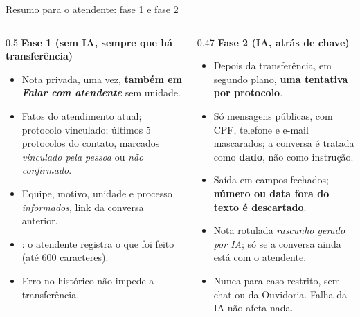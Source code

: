 \documentclass[aspectratio=169,10pt]{beamer}
\newcommand{\code}[1]{\texttt{\detokenize{#1}}}
\begin{document}
\begin{frame}{Resumo para o atendente: fase 1 e fase 2}
\begin{columns}[T]
\begin{column}{0.5\textwidth}
\textbf{Fase 1 (sem IA, sempre que há transferência)}
\begin{itemize}\setlength\itemsep{3pt}\scriptsize
  \item Nota privada, uma vez, \textbf{também em \emph{Falar com atendente}} sem unidade.
  \item Fatos do atendimento atual; protocolo vinculado; últimos 5 protocolos do contato, marcados \emph{vinculado pela pessoa} ou \emph{não confirmado}.
  \item Equipe, motivo, unidade e processo \emph{informados}, link da conversa anterior.
  \item \code{/encerrar <resumo>}: o atendente registra o que foi feito (até 600 caracteres).
  \item Erro no histórico não impede a transferência.
\end{itemize}
\end{column}
\begin{column}{0.47\textwidth}
\textbf{Fase 2 (IA, atrás de chave)}
\begin{itemize}\setlength\itemsep{3pt}\scriptsize
  \item Depois da transferência, em segundo plano, \textbf{uma tentativa por protocolo}.
  \item Só mensagens públicas, com CPF, telefone e e-mail mascarados; a conversa é tratada como \textbf{dado}, não como instrução.
  \item Saída em campos fechados; \textbf{número ou data fora do texto é descartado}.
  \item Nota rotulada \emph{rascunho gerado por IA}; só se a conversa ainda está com o atendente.
  \item \alert{Nunca} para caso restrito, sem chat ou da Ouvidoria. Falha da IA não afeta nada.
\end{itemize}
\end{column}
\end{columns}
\end{frame}
\end{document}

